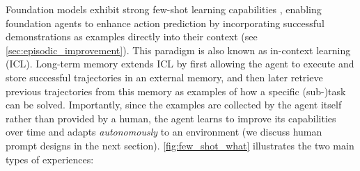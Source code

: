 Foundation models exhibit strong few-shot learning capabilities \citep{brown_language_2020}, enabling foundation agents to enhance action prediction by incorporating successful demonstrations as examples directly into their context (see \cref{sec:episodic_improvement}).
This paradigm is also known as in-context learning (ICL).
Long-term memory extends ICL by first allowing the agent to execute and store successful trajectories in an external memory, and then later retrieve previous trajectories from this memory as examples of how a specific (sub-)task can be solved.
Importantly, since the examples are collected by the agent itself rather than provided by a human, the agent learns to improve its capabilities over time and adapts \emph{autonomously} to an environment (we discuss human prompt designs in the next section).
\cref{fig:few_shot_what} illustrates the two main types of experiences:

